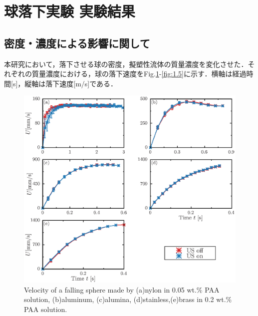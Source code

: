 \section{球落下実験 実験結果}
\label{sec:expData}

\subsection{密度・濃度による影響に関して}
本研究において，落下させる球の密度，擬塑性流体の質量濃度を変化させた．それぞれの質量濃度における，球の落下速度をFig.\ref{fig:0.05-0.2}-\ref{fig:1.5}に示す．横軸は経過時間[s]，縦軸は落下速度[m/s]である．

\begin{figure}[H]
    \centering
    \includegraphics[width=1.0\textwidth]{5-Results/0.05-0.2.eps}
    \caption{Velocity of a falling sphere made by (a)nylon in 0.05 wt.\% PAA solution, (b)aluminum, (c)alumina, (d)stainless,(e)brass in 0.2 wt.\% PAA solution.}
    \label{fig:0.05-0.2}
\end{figure}

